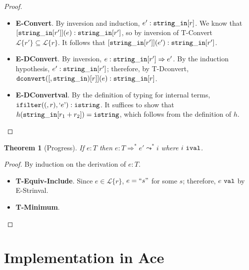 \documentclass[10pt,preprint]{sigplanconf}
\newtheorem{thm}{Theorem}
\theoremstyle{definition}
\newcommand{\Lagr}{\mathcal{L}}
\newcommand{\strin}{{\tt string\_in}}
\newcommand{\lang}[1]{\Lagr\{#1\}}
\newcommand{\istr}{ {\tt istring} }
\newcommand{\dconvert}[2]{ {\tt dconvert}(#1,#2) }
\newcommand{\ifilter}[2]{ {\tt ifilter}(#1,#2) }
\newcommand{\reduces}{ \Rightarrow }
\newcommand{\ireduces}{ \leadsto }
\newcommand{\val}{ \ {\tt val} }
\newcommand{\ival}{ \ {\tt ival} }
\newcommand{\istrf}[1]{`#1\textrm'} %
\newcommand{\strf}[1]{``#1"}
\begin{document}
\begin{proof}
\begin{itemize}[label=$ $,itemsep=1ex]
  \item \textbf{E-Convert}. By inversion and induction, $e' : \strin[r]$. We know that $[\strin[r']](e) : \strin[r']$, so by inversion of T-Convert $\lang{r'} \subseteq \lang{r}$.
    It follows that $[\strin[r']](e') : \strin[r']$.
  \item \textbf{E-DConvert}. By inversion, $e : \strin[r'] \reduces e'$. By the induction hypothesis, $e' : \strin[r']$; therefore, by T-Dconvert, $\dconvert[\strin[r]](e):\strin[r]$.
  \item \textbf{E-DConvertval}. By the definition of typing for internal terms, $\ifilter(r,\istrf{e}) : \istr$. It suffices to show that $h(\strin[r_1+r_2]) = \istr$, which follows from the definition of $h$.
\end{itemize}
\end{proof}

\begin{thm}[Progress]
  If $e:T$ then $e:T \reduces^* e' \ireduces^* i$ where $i \ival$.
\end{thm}
\begin{proof}
By induction on the derivation of $e:T$.
\begin{itemize}[label=$ $,itemsep=1ex]
  \item \textbf{T-Equiv-Include}. Since $e \in \lang{r}$, $e = \strf{s}$ for some $s$; therefore, $e \val$ by E-Strinval.
  \item \textbf{T-Minimum}. 
\end{itemize}
\end{proof}

\section{Implementation in Ace}
\end{document}
